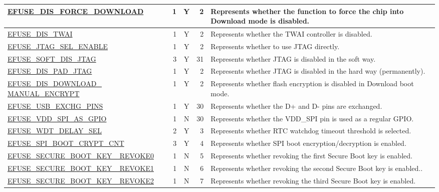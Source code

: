 \begin{longtable}[c]{ |m{8.2cm}|r|c|r|m{9cm}| }
    \hline
    \hyperref[fielddesc:EFUSEDISFORCEDOWNLOAD]{EFUSE\_DIS\_FORCE\_DOWNLOAD} & 1 & Y & 2 & Represents whether the function to force the chip into Download mode is disabled.\\   
    \hline
    \hyperref[fielddesc:EFUSEDISTWAI]{EFUSE\_DIS\_TWAI} & 1 & Y & 2 & Represents whether the TWAI controller is disabled.\\  
    \hline
    \hyperref[fielddesc:EFUSEJTAGSELENABLE]{EFUSE\_JTAG\_SEL\_ENABLE} & 1 & Y & 2 & Represents whether to use JTAG directly. \\   
    \hline
    \hyperref[fielddesc:EFUSESOFTDISJTAG]{EFUSE\_SOFT\_DIS\_JTAG}  & 3 & Y & 31 & Represents whether JTAG is disabled in the soft way.\\    
    \hline
    \hyperref[fielddesc:EFUSEDISPADJTAG]{EFUSE\_DIS\_PAD\_JTAG}  & 1 & Y & 2 & Represents whether JTAG is disabled in the hard way (permanently).\\   
    \hline
    \hyperref[fielddesc:EFUSEDISDOWNLOADMANUALENCRYPT]{EFUSE\_DIS\_DOWNLOAD\_ MANUAL\_ENCRYPT}  &  1 & Y & 2 & Represents whether flash encryption is disabled in Download boot mode.\\ 
    \hline
    \hyperref[fielddesc:EFUSEUSBEXCHGPINS]{EFUSE\_USB\_EXCHG\_PINS}  & 1 & Y & 30 & Represents whether the D+ and D- pins are exchanged. \\
    \hline
    \hyperref[fielddesc:EFUSEVDDSPIASGPIO]{EFUSE\_VDD\_SPI\_AS\_GPIO}  & 1 & N & 30 & Represents whether the VDD\_SPI pin is used as a regular GPIO.
    \\    
    \hline
    \hyperref[fielddesc:EFUSEWDTDELAYSEL]{EFUSE\_WDT\_DELAY\_SEL} & 2 & Y & 3 & Represents whether RTC watchdog timeout threshold is selected. \\
    \hline
    \hyperref[fielddesc:EFUSESPIBOOTCRYPTCNT]{EFUSE\_SPI\_BOOT\_CRYPT\_CNT}  & 3 & Y & 4 & Represents whether SPI boot encryption/decryption is enabled.\\
    \hline
    \hyperref[fielddesc:EFUSESECUREBOOTKEYREVOKE0]{EFUSE\_SECURE\_BOOT\_KEY\_ REVOKE0} & 1 & N & 5 & Represents whether revoking the first Secure Boot key is enabled. \\
    \hline
    \hyperref[fielddesc:EFUSESECUREBOOTKEYREVOKE1]{EFUSE\_SECURE\_BOOT\_KEY\_ REVOKE1}  & 1 & N & 6 & Represents whether revoking the second Secure Boot key is enabled.. \\
    \hline
    \hyperref[fielddesc:EFUSESECUREBOOTKEYREVOKE2]{EFUSE\_SECURE\_BOOT\_KEY\_ REVOKE2} & 1 & N & 7 & Represents whether revoking the third Secure Boot key is enabled. \\

\end{longtable}
